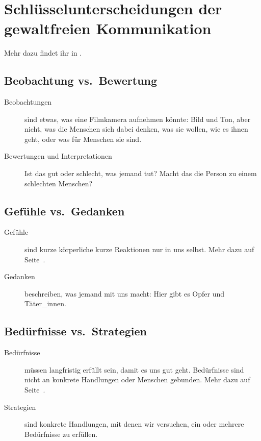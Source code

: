 \section{Schlüsselunterscheidungen der gewaltfreien Kommunikation}
\label{gfk-schluesselunterscheidungen}

Mehr dazu findet ihr in \cite[S. 35ff]{gfk-dummies}.

\subsection{Beobachtung vs.~Bewertung}

\begin{description}
 \item[Beobachtungen] sind etwas, was eine Filmkamera aufnehmen könnte: Bild und Ton, aber nicht, was die Menschen sich dabei denken, was sie wollen, wie es ihnen geht, oder was für Menschen sie sind.
 \item[Bewertungen und Interpretationen] Ist das gut oder schlecht, was jemand tut? Macht das die Person zu einem schlechten Menschen?
\end{description}


\subsection{Gefühle vs.~Gedanken}

\begin{description}
 \item[Gefühle] sind kurze körperliche kurze Reaktionen nur in uns selbst. Mehr dazu auf Seite~\pageref{gefuehle}.
 \item[Gedanken] beschreiben, was jemand mit uns macht: Hier gibt es Opfer und Täter\_innen.
\end{description}


\subsection{Bedürfnisse vs.~Strategien}

\begin{description}
 \item[Bedürfnisse] müssen langfristig erfüllt sein, damit es uns gut geht. Bedürfnisse sind nicht an konkrete Handlungen oder Menschen gebunden. Mehr dazu auf Seite~\pageref{beduerfnisse}.
 \item[Strategien] sind konkrete Handlungen, mit denen wir versuchen, ein oder mehrere Bedürfnisse zu erfüllen.
\end{description}

